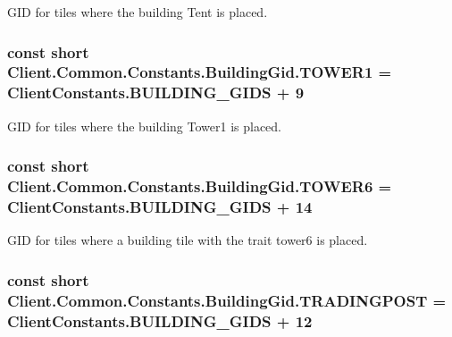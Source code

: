 G\+I\+D for tiles where the building Tent is placed. 

\hypertarget{classClient_1_1Common_1_1Constants_1_1BuildingGid_a9518288b33138fb96c7894ce417498f8}{}
\subsubsection[{T\+O\+W\+E\+R1}]{\setlength{\rightskip}{0pt plus 5cm}const short Client.\+Common.\+Constants.\+Building\+Gid.\+T\+O\+W\+E\+R1 = {\bf Client\+Constants.\+B\+U\+I\+L\+D\+I\+N\+G\+\_\+\+G\+I\+D\+S} + 9}\label{classClient_1_1Common_1_1Constants_1_1BuildingGid_a9518288b33138fb96c7894ce417498f8}


G\+I\+D for tiles where the building Tower1 is placed. 

\hypertarget{classClient_1_1Common_1_1Constants_1_1BuildingGid_ae8f7164d2a014c73d3a7e4a0bd63d85c}{}
\subsubsection[{T\+O\+W\+E\+R6}]{\setlength{\rightskip}{0pt plus 5cm}const short Client.\+Common.\+Constants.\+Building\+Gid.\+T\+O\+W\+E\+R6 = {\bf Client\+Constants.\+B\+U\+I\+L\+D\+I\+N\+G\+\_\+\+G\+I\+D\+S} + 14}\label{classClient_1_1Common_1_1Constants_1_1BuildingGid_ae8f7164d2a014c73d3a7e4a0bd63d85c}


G\+I\+D for tiles where a building tile with the trait tower6 is placed. 

\hypertarget{classClient_1_1Common_1_1Constants_1_1BuildingGid_aa6660c0b27df8d12b9c1c417027cea43}{}
\subsubsection[{T\+R\+A\+D\+I\+N\+G\+P\+O\+S\+T}]{\setlength{\rightskip}{0pt plus 5cm}const short Client.\+Common.\+Constants.\+Building\+Gid.\+T\+R\+A\+D\+I\+N\+G\+P\+O\+S\+T = {\bf Client\+Constants.\+B\+U\+I\+L\+D\+I\+N\+G\+\_\+\+G\+I\+D\+S} + 12}\label{classClient_1_1Common_1_1Constants_1_1BuildingGid_aa6660c0b27df8d12b9c1c417027cea43}


